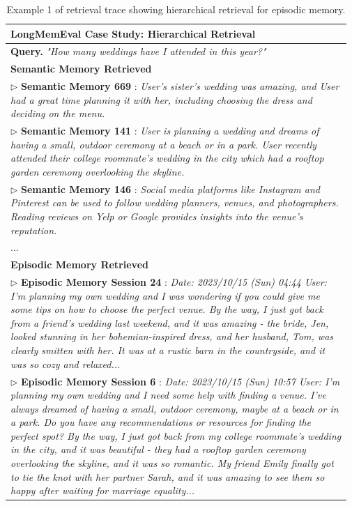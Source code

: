 \begin{table}[H]
\centering
\small
\caption{Example 1 of retrieval trace showing hierarchical retrieval for episodic memory.}
\label{tab:case_longmemeval_2}

\setlength{\tabcolsep}{8pt}
\renewcommand{\arraystretch}{1.1}
\begin{tabularx}{\linewidth}{p{0.97\linewidth}}

\toprule
\textbf{LongMemEval Case Study: Hierarchical Retrieval}\\
\midrule
\textbf{Query.} \emph{"How many weddings have I attended in this year?"}\\
\midrule
\textbf{Semantic Memory Retrieved}\\
\midrule
\(\triangleright\) \textbf{Semantic Memory 669} : \emph{User's sister's wedding was amazing, and User had a great time planning it with her, including choosing the dress and deciding on the menu.}\\
\(\triangleright\) \textbf{Semantic Memory 141} : \emph{User is planning a wedding and dreams of having a small, outdoor ceremony at a beach or in a park. User recently attended their college roommate's wedding in the city which had a rooftop garden ceremony overlooking the skyline.}\\
\(\triangleright\) \textbf{Semantic Memory 146} : \emph{Social media platforms like Instagram and Pinterest can be used to follow wedding planners, venues, and photographers. Reading reviews on Yelp or Google provides insights into the venue's reputation.}\\
...\\
\midrule
\textbf{Episodic Memory Retrieved}\\
\midrule
\(\triangleright\) \textbf{Episodic Memory Session 24} : \emph{Date: 2023/10/15 (Sun) 04:44 User: I'm planning my own wedding and I was wondering if you could give me some tips on how to choose the perfect venue. By the way, I just got back from a friend's wedding last weekend, and it was amazing - the bride, Jen, looked stunning in her bohemian-inspired dress, and her husband, Tom, was clearly smitten with her. It was at a rustic barn in the countryside, and it was so cozy and relaxed...}\\
\(\triangleright\) \textbf{Episodic Memory Session 6} : \emph{Date: 2023/10/15 (Sun) 10:57 User: I'm planning my own wedding and I need some help with finding a venue. I've always dreamed of having a small, outdoor ceremony, maybe at a beach or in a park. Do you have any recommendations or resources for finding the perfect spot? By the way, I just got back from my college roommate's wedding in the city, and it was beautiful - they had a rooftop garden ceremony overlooking the skyline, and it was so romantic. My friend Emily finally got to tie the knot with her partner Sarah, and it was amazing to see them so happy after waiting for marriage equality... }\\

\end{tabularx}
\end{table}
